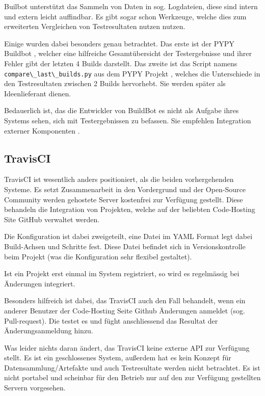 Builbot unterst\"utzt das Sammeln von Daten in sog. Logdateien,
diese sind intern und extern leicht auffindbar.
Es gibt sogar schon Werkzeuge, welche dies zum erweiterten Vergleichen von Testresultaten nutzen nutzen.

Einige wurden dabei besonders genau betrachtet.
Das erste ist der PYPY Buildbot \cite{pypy:overview} , welcher eine hilfreiche Gesamtübersicht der Testergebnisse und ihrer Fehler gibt
der letzten 4 Builds darstellt.
Das zweite ist das Script namens \verb|compare\_last\_builds.py|
aus dem PYPY Projekt \cite{pypy:diffscript} ,
welches die Unterschiede in den Testresultaten zwischen 2 Builds hervorhebt.
Sie werden sp\"ater als Ideenlieferant dienen.

Bedauerlich ist, das die Entwickler von BuildBot es nicht als Aufgabe ihres Systems sehen,
sich mit Testergebnissen zu befassen.
Sie empfehlen Integration externer Komponenten \cite{buildbot:irc}.

\subsection{TravisCI}


TravisCI \cite{travisci:website} ist wesentlich anders positioniert, als die beiden vorhergehenden Systeme.
Es setzt Zusammenarbeit in den Vordergrund und der Open-Source Community werden gehostete Server
kostenfrei zur Verf\"ugung gestellt.
Diese behandeln die Integration von Projekten,
welche auf der beliebten Code-Hosting Site GitHub verwaltet werden.

Die Konfiguration ist dabei zweigeteilt,
eine Datei im YAML Format \cite{yaml:website} legt dabei Build-Achsen und Schritte fest.
Diese Datei befindet sich in Versionskontrolle beim Projekt
(was die Konfiguration sehr flexibel gestaltet).

Ist ein Projekt erst einmal im System registriert,
so wird es regelm\"assig bei Änderungen integriert.

Besonders hilfreich ist dabei, das TravisCI auch den Fall behandelt,
wenn ein anderer Benutzer der Code-Hosting Seite Github \"Anderungen anmeldet
\cite{github:pullreq} (sog. Pull-request).
Die testet es und f\"ught anschliessend das Resultat der \"Anderungsanmeldung hinzu.

Was leider nichts daran \"andert, das TravisCI keine externe API zur Verfügung stellt.
Es ist ein geschlossenes System, außerdem hat es kein Konzept f\"ur Datensammlung/Artefakte
und auch Testresultate werden nicht betrachtet.
Es ist nicht portabel und scheinbar f\"ur den Betrieb nur
auf den zur Verfügung gestellten Servern vorgesehen.


